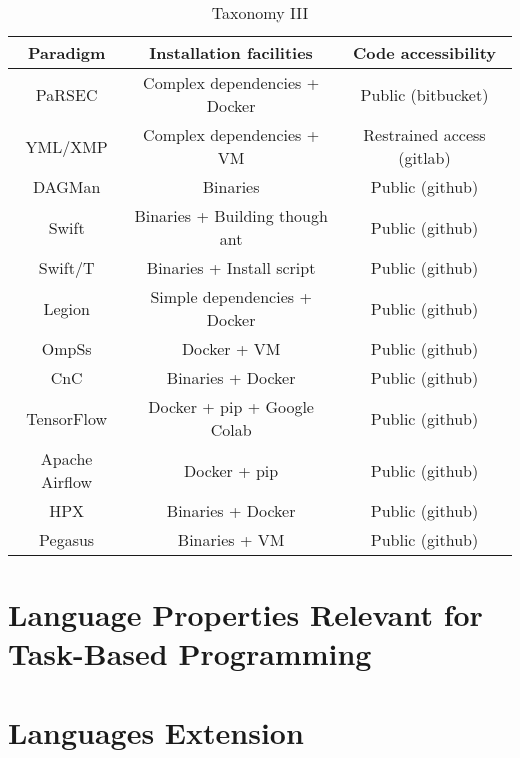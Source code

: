 \begin{table}[H]
	\caption{Taxonomy III}
	\centering
	\begin{tabular}{c|c|c}
		Paradigm       & Installation facilities        & Code accessibility         \\ \hline
		PaRSEC         & Complex dependencies + Docker  & Public (bitbucket)         \\
		YML/XMP        & Complex dependencies + VM      & Restrained access (gitlab) \\
		DAGMan         & Binaries                       & Public (github)            \\
		Swift          & Binaries + Building though ant & Public (github)            \\
		Swift/T        & Binaries + Install script      & Public (github)            \\
		Legion         & Simple dependencies + Docker   & Public (github)            \\
		OmpSs          & Docker + VM                    & Public (github)            \\
		CnC            & Binaries + Docker              & Public (github)            \\
		TensorFlow     & Docker + pip + Google Colab    & Public (github)            \\
		Apache Airflow & Docker + pip                   & Public (github)            \\
		HPX            & Binaries + Docker              & Public (github)            \\
		Pegasus        & Binaries + VM                  & Public (github)            \\
	\end{tabular}
\end{table}


\section{Language Properties Relevant for Task-Based Programming}

\section{Languages Extension}